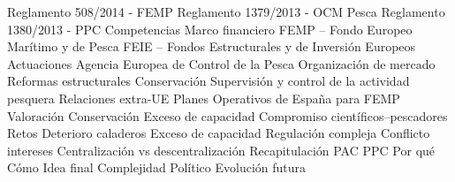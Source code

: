 \documentclass{nuevotema}
\begin{document}
\begin{esquema}[enumerate]
			\3 Reglamento 508/2014 - FEMP
			\3 Reglamento 1379/2013 - OCM Pesca
			\3 Reglamento 1380/2013 - PPC
			\3 Competencias
		\2 Marco financiero
			\3 FEMP -- Fondo Europeo Marítimo y de Pesca
			\3 FEIE -- Fondos Estructurales y de Inversión Europeos
		\2 Actuaciones
			\3 Agencia Europea de Control de la Pesca
			\3 Organización de mercado
			\3 Reformas estructurales
			\3 Conservación
			\3 Supervisión y control de la actividad pesquera
			\3 Relaciones extra-UE
			\3 Planes Operativos de España para FEMP
		\2 Valoración
			\3 Conservación
			\3 Exceso de capacidad
			\3 Compromiso científicos--pescadores
		\2 Retos
			\3 Deterioro caladeros
			\3 Exceso de capacidad
			\3 Regulación compleja
			\3 Conflicto intereses
			\3 Centralización vs descentralización
	\1[] 
		\2 Recapitulación
			\3 PAC
			\3 PPC
			\3 Por qué
			\3 Cómo
		\2 Idea final
			\3 Complejidad
			\3 Político
			\3 Evolución futura

\end{esquema}

\esquemalargo
\end{document}
